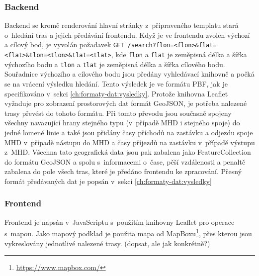 \subsubsection{Backend}
Backend se kromě renderování hlavní stránky z~připraveného templatu stará
o~hledání tras a jejich předávání frontendu. Když je ve frontendu zvolen výchozí a
cílový bod, je vyvolán požadavek {\tt GET
/search?flon=<flon>\&flat=<flat>\&tlon=<tlon>\&tlat=<tlat>}, kde {\tt flon} a
{\tt flat} je zeměpisná délka a šířka výchozího bodu a {\tt tlon} a {\tt tlat}
je zeměpisná délka a šířka cílového bodu. Souřadnice výchozího a cílového bodu
jsou předány vyhledávací knihovně a počká se na vrácení výsledku hledání. Tento
výsledek je ve formátu PBF, jak je specifikováno v~sekci \ref{ch:formaty-dat:vysledky}.
Protože knihovna Leaflet vyžaduje pro zobrazení prostorových dat formát
GeoJSON\cite{GeoJSON}, je potřeba nalezené trasy převést do tohoto formátu. Při
tomto převodu jsou současně spojeny všechny navazující hrany stejného typu
(v~případě MHD i stejného spoje) do jedné lomené linie a také jsou přidány časy
příchodů na zastávku a odjezdu spoje MHD v~případě nástupu do MHD a časy
příjezdů na zastávku v~případě výstupu z~MHD. Všechna tato geografická data jsou
pak zabalena jako FeatureCollection do formátu GeoJSON a spolu s~informacemi
o~čase, pěší vzdálenosti a penaltě zabalena do pole všech tras, které je předáno
frontendu ke zpracování. Přesný formát předávaných dat je popsán v~sekci \ref{ch:formaty-dat:vysledky}
\subsubsection{Frontend}
Frontend je napsán v~JavaScriptu s~použitím knihovny Leaflet pro operace
s~mapou. Jako mapový podklad je použita mapa od
MapBoxu\footnote{\url{https://www.mapbox.com/}}, přes kterou
jsou vykreslovány jednotlivé nalezené trasy. (\TODO dopsat, ale jak konkrétně?)
